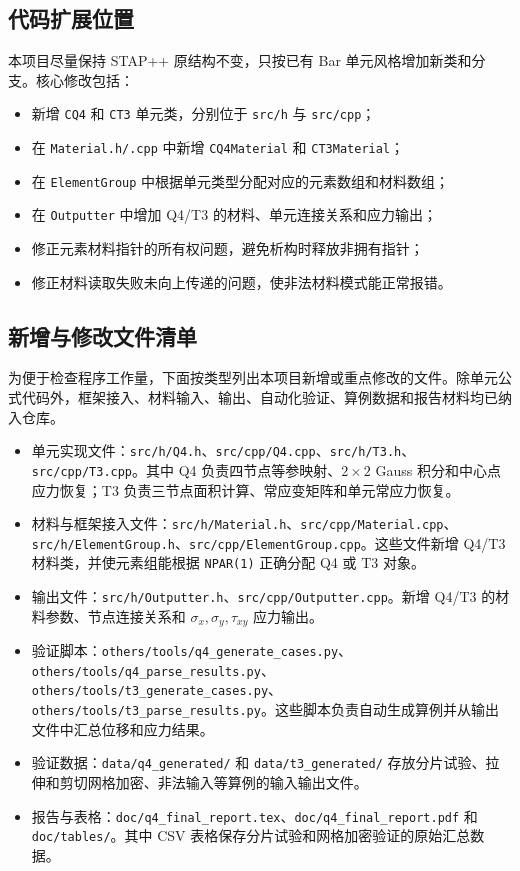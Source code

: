 ﻿\documentclass[UTF8,11pt,a4paper]{ctexart}
\begin{document}
\subsection{代码扩展位置}
本项目尽量保持 STAP++ 原结构不变，只按已有 Bar 单元风格增加新类和分支。核心修改包括：
\begin{itemize}
  \item 新增 \texttt{CQ4} 和 \texttt{CT3} 单元类，分别位于 \texttt{src/h} 与 \texttt{src/cpp}；
  \item 在 \texttt{Material.h/.cpp} 中新增 \texttt{CQ4Material} 和 \texttt{CT3Material}；
  \item 在 \texttt{ElementGroup} 中根据单元类型分配对应的元素数组和材料数组；
  \item 在 \texttt{Outputter} 中增加 Q4/T3 的材料、单元连接关系和应力输出；
  \item 修正元素材料指针的所有权问题，避免析构时释放非拥有指针；
  \item 修正材料读取失败未向上传递的问题，使非法材料模式能正常报错。
\end{itemize}

\subsection{新增与修改文件清单}
为便于检查程序工作量，下面按类型列出本项目新增或重点修改的文件。除单元公式代码外，框架接入、材料输入、输出、自动化验证、算例数据和报告材料均已纳入仓库。

\begin{itemize}
  \item 单元实现文件：\texttt{src/h/Q4.h}、\texttt{src/cpp/Q4.cpp}、\texttt{src/h/T3.h}、\texttt{src/cpp/T3.cpp}。其中 Q4 负责四节点等参映射、$2\times2$ Gauss 积分和中心点应力恢复；T3 负责三节点面积计算、常应变矩阵和单元常应力恢复。
  \item 材料与框架接入文件：\texttt{src/h/Material.h}、\texttt{src/cpp/Material.cpp}、\texttt{src/h/ElementGroup.h}、\texttt{src/cpp/ElementGroup.cpp}。这些文件新增 Q4/T3 材料类，并使元素组能根据 \texttt{NPAR(1)} 正确分配 Q4 或 T3 对象。
  \item 输出文件：\texttt{src/h/Outputter.h}、\texttt{src/cpp/Outputter.cpp}。新增 Q4/T3 的材料参数、节点连接关系和 $\sigma_x,\sigma_y,\tau_{xy}$ 应力输出。
  \item 验证脚本：\texttt{others/tools/q4\_generate\_cases.py}、\texttt{others/tools/q4\_parse\_results.py}、\texttt{others/tools/t3\_generate\_cases.py}、\texttt{others/tools/t3\_parse\_results.py}。这些脚本负责自动生成算例并从输出文件中汇总位移和应力结果。
  \item 验证数据：\texttt{data/q4\_generated/} 和 \texttt{data/t3\_generated/} 存放分片试验、拉伸和剪切网格加密、非法输入等算例的输入输出文件。
  \item 报告与表格：\texttt{doc/q4\_final\_report.tex}、\texttt{doc/q4\_final\_report.pdf} 和 \texttt{doc/tables/}。其中 CSV 表格保存分片试验和网格加密验证的原始汇总数据。
\end{itemize}
\end{document}
